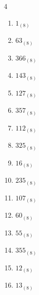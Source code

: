 \begin{multicols}{4}
\begin{enumerate}
  \item $1_{(8)}$

        \phantom{$=1$}

  \item $63_{(8)}$

        \phantom{$=51$}

  \item $366_{(8)}$

        \phantom{$=246$}

  \item $143_{(8)}$

        \phantom{$=99$}

  \item $127_{(8)}$

        \phantom{$=87$}

  \item $357_{(8)}$

        \phantom{$=239$}

  \item $112_{(8)}$

        \phantom{$=74$}

  \item $325_{(8)}$

        \phantom{$=213$}

  \item $16_{(8)}$

        \phantom{$=14$}

  \item $235_{(8)}$

        \phantom{$=157$}

  \item $107_{(8)}$

        \phantom{$=71$}

\columnbreak %

  \item $60_{(8)}$

        \phantom{$=48$}

  \item $55_{(8)}$

        \phantom{$=45$}

  \item $355_{(8)}$

        \phantom{$=237$}

  \item $12_{(8)}$

        \phantom{$=10$}

  \item $13_{(8)}$


\end{enumerate}
\end{multicols}
